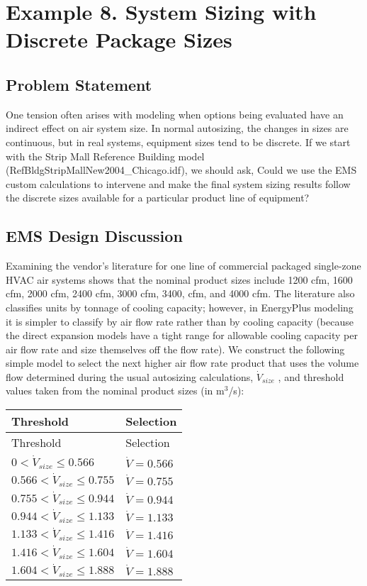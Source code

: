 \section{Example 8. System Sizing with Discrete Package Sizes}\label{example-8.-system-sizing-with-discrete-package-sizes}

\subsection{Problem Statement}\label{problem-statement-010}

One tension often arises with modeling when options being evaluated have an indirect effect on air system size. In normal autosizing, the changes in sizes are continuous, but in real systems, equipment sizes tend to be discrete. If we start with the Strip Mall Reference Building model (RefBldgStripMallNew2004\_Chicago.idf), we should ask, Could we use the EMS custom calculations to intervene and make the final system sizing results follow the discrete sizes available for a particular product line of equipment?

\subsection{EMS Design Discussion}\label{ems-design-discussion-010}

Examining the vendor's literature for one line of commercial packaged single-zone HVAC air systems shows that the nominal product sizes include 1200 cfm, 1600 cfm, 2000 cfm, 2400 cfm, 3000 cfm, 3400, cfm, and 4000 cfm. The literature also classifies units by tonnage of cooling capacity; however, in EnergyPlus modeling it is simpler to classify by air flow rate rather than by cooling capacity (because the direct expansion models have a tight range for allowable cooling capacity per air flow rate and size themselves off the flow rate). We construct the following simple model to select the next higher air flow rate product that uses the volume flow determined during the usual autosizing calculations, \(\dot{V}_{size}\) , and threshold values taken from the nominal product sizes (in m\(^{3}\)/s):

\begin{longtable}[c]{p{4.03in}p{1.96in}}
\toprule 
Threshold & Selection \tabularnewline
\midrule
\endfirsthead

\toprule 
Threshold & Selection \tabularnewline
\midrule
\endhead

$0  <  \dot{V}_{size} \leq 0.566$ & $\dot{V} = 0.566$ \tabularnewline
$0.566  <  \dot{V}_{size} \leq 0.755$ & $\dot{V} = 0.755$ \tabularnewline
$0.755  <  \dot{V}_{size} \leq 0.944$ & $\dot{V} = 0.944$ \tabularnewline
$0.944  <  \dot{V}_{size} \leq 1.133$ & $\dot{V} = 1.133$ \tabularnewline
$1.133  <  \dot{V}_{size} \leq 1.416$ & $\dot{V} = 1.416$ \tabularnewline
$1.416  <  \dot{V}_{size} \leq 1.604$ & $\dot{V} = 1.604$ \tabularnewline
$1.604  <  \dot{V}_{size} \leq 1.888$ & $\dot{V} = 1.888$ \tabularnewline
\bottomrule
\end{longtable}

